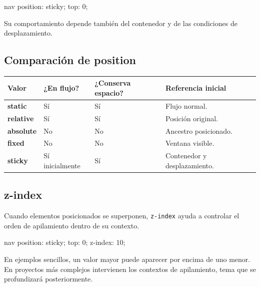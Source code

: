 \documentclass[11pt]{article}
\begin{document}
    \begin{csscodedark}
        nav {
            position: sticky;
            top: 0;
        }
    \end{csscodedark}

    Su comportamiento depende también del contenedor y de las condiciones de desplazamiento.

    \subsection{Comparación de position}

    \begin{center}
        \begin{tabularx}{0.94\textwidth}{>{\bfseries}p{2.2cm}p{2.8cm}p{3.5cm}X}
            \toprule
            Valor & ¿En flujo? & ¿Conserva espacio? & Referencia inicial \\
            \midrule
            static & Sí & Sí & Flujo normal. \\
            relative & Sí & Sí & Posición original. \\
            absolute & No & No & Ancestro posicionado. \\
            fixed & No & No & Ventana visible. \\
            sticky & Sí inicialmente & Sí & Contenedor y desplazamiento. \\
            \bottomrule
        \end{tabularx}
    \end{center}

    \subsection{z-index}

    Cuando elementos posicionados se superponen, \texttt{z-index} ayuda a controlar el orden de apilamiento dentro de su contexto.

    \begin{csscodedark}
        nav {
            position: sticky;
            top: 0;
            z-index: 10;
        }
    \end{csscodedark}

    En ejemplos sencillos, un valor mayor puede aparecer por encima de uno menor. En proyectos más complejos intervienen los contextos de apilamiento, tema que se profundizará posteriormente.

\end{document}
